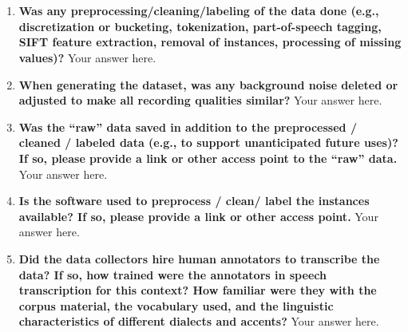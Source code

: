 \documentclass{article}
\begin{document}
    \\\\
    \noindent{}
    \begin{enumerate}[leftmargin=0.65cm]
        \scriptsize
        \item \textbf{Was any preprocessing/cleaning/labeling of the data done (e.g., discretization or bucketing, tokenization, part-of-speech tagging, SIFT feature extraction, removal of instances, processing of missing values)?}
        \newline 
        Your answer here.
        \newline 
        
        \item \textbf{When generating the dataset, was any background noise deleted or adjusted to make all recording qualities similar?} 
        \newline 
        Your answer here.
        \newline 
        
        \item \textbf{Was the “raw” data saved in addition to the preprocessed / cleaned / labeled data (e.g., to support unanticipated future uses)? If so, please provide a link or other access point to the “raw” data.}
        \newline 
        Your answer here.
        \newline 
        
        \item \textbf{Is the software used to preprocess / clean/ label the instances available? If so, please provide a link or other access point.}
        \newline 
        Your answer here.
        \newline 
        
        \item \textbf{Did the data collectors hire human annotators to transcribe the data? If so, how trained were the annotators in speech transcription for this context? How familiar were they with the corpus material, the vocabulary used, and the linguistic characteristics of different dialects and accents?}
        \newline 
        Your answer here.
        \newline 
        

\end{enumerate}
\end{document}
